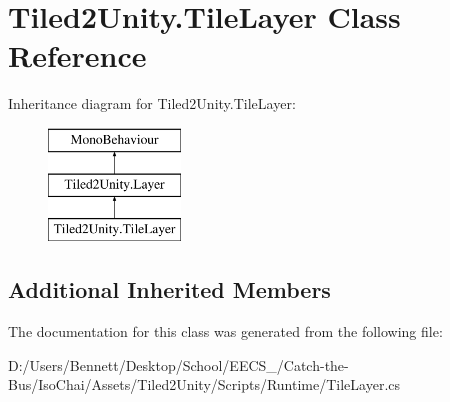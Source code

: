 \hypertarget{class_tiled2_unity_1_1_tile_layer}{}\section{Tiled2\+Unity.\+Tile\+Layer Class Reference}
\label{class_tiled2_unity_1_1_tile_layer}
Inheritance diagram for Tiled2\+Unity.\+Tile\+Layer\+:\begin{figure}[H]
\begin{center}
\leavevmode
\includegraphics[height=3.000000cm]{class_tiled2_unity_1_1_tile_layer}
\end{center}
\end{figure}
\subsection*{Additional Inherited Members}


The documentation for this class was generated from the following file\+:\begin{DoxyCompactItemize}
\item 
D\+:/\+Users/\+Bennett/\+Desktop/\+School/\+E\+E\+C\+S\+\_/\+Catch-\/the-\/\+Bus/\+Iso\+Chai/\+Assets/\+Tiled2\+Unity/\+Scripts/\+Runtime/Tile\+Layer.\+cs\end{DoxyCompactItemize}
